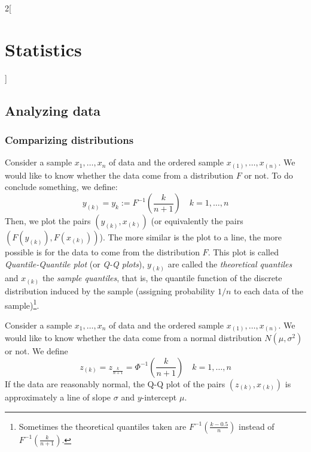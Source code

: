 \documentclass[../../../main.tex]{subfiles}
\begin{document}
\begin{multicols}{2}[\section{Statistics}]
  \subsection{Analyzing data}
  \subsubsection{Comparizing distributions}
  \begin{definition}[Q-Q plots]
    Consider a sample $x_1,\ldots,x_n$ of data and the ordered sample $x_{(1)},\ldots,x_{(n)}$. We would like to know whether the data come from a distribution $F$ or not. To do conclude something, we define: $$y_{(k)}=y_k:=F^{-1}\left(\frac{k}{n+1}\right)\quad k=1,\ldots,n$$
    Then, we plot the pairs $(y_{(k)},x_{(k)})$ (or equivalently the pairs $(F(y_{(k)}),F(x_{(k)}))$). The more similar is the plot to a line, the more possible is for the data to come from the distribution $F$. This plot is called \emph{Quantile-Quantile plot} (or \emph{Q-Q plots}), $y_{(k)}$ are called the \emph{theoretical quantiles} and $x_{(k)}$ the \emph{sample quantiles}, that is, the quantile function of the discrete distribution induced by the sample (assigning probability $1/n$ to each data of the sample)\footnote{Sometimes the theoretical quantiles taken are $F^{-1}\left(\frac{k-0.5}{n}\right)$ instead of $F^{-1}\left(\frac{k}{n+1}\right)$.}.
  \end{definition}
  \begin{proposition}
    Consider a sample $x_1,\ldots,x_n$ of data and the ordered sample $x_{(1)},\ldots,x_{(n)}$. We would like to know whether the data come from a normal distribution $N(\mu,\sigma^2)$ or not. We define $$z_{(k)}=z_{\frac{k}{n+1}}=\Phi^{-1}\left(\frac{k}{n+1}\right)\quad k=1,\ldots,n$$
    If the data are reasonably normal, the Q-Q plot of the pairs $(z_{(k)},x_{(k)})$ is approximately a line of slope $\sigma$ and $y$-intercept $\mu$.
  \end{proposition}
  \begin{center}
    \begin{minipage}{\linewidth}
      \centering
      
    \end{minipage}
  \end{center}
\end{multicols}
\end{document}
